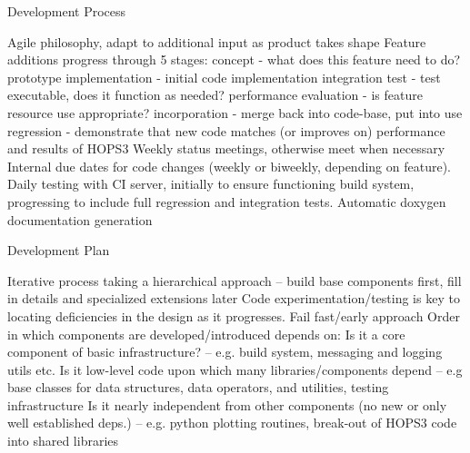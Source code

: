 \documentclass[8pt]{beamer}
\begin{document}
\begin{frame}{Development Process}
    \begin{outline}
        \1 Agile philosophy, adapt to additional input as product takes shape
        \1 Feature additions progress through 5 stages:
            \2 concept - what does this feature need to do?
            \2 prototype implementation - initial code implementation
            \2 integration test - test executable, does it function as needed?
            \2 performance evaluation - is feature resource use appropriate?
            \2 incorporation - merge back into code-base, put into use
            \2 regression - demonstrate that new code matches (or improves on) performance and results of HOPS3
        \1 Weekly status meetings, otherwise meet when necessary
        \1 Internal due dates for code changes (weekly or biweekly, depending on feature).
        \1 Daily testing with CI server, initially to ensure functioning build system, progressing to include full regression and integration tests.
        \1 Automatic doxygen documentation generation
    \end{outline}
\end{frame}

\begin{frame}{Development Plan}


    \begin{outline}
    \1 Iterative process taking a hierarchical approach -- build base components first, fill in details and specialized extensions later
    \1 Code experimentation/testing is key to locating deficiencies in the design as it progresses. Fail fast/early approach
    \1 Order in which components are developed/introduced depends on:
    \2 Is it a core component of basic infrastructure? -- e.g. build system, messaging and logging utils etc.
    \2 Is it low-level code upon which many libraries/components depend -- e.g base classes for data structures, data operators, and utilities, testing infrastructure
    \2 Is it nearly independent from other components (no new or only well established deps.) -- e.g. python plotting routines, break-out of HOPS3 code into shared libraries
    \end{outline}
\end{frame}
    
\end{document}
